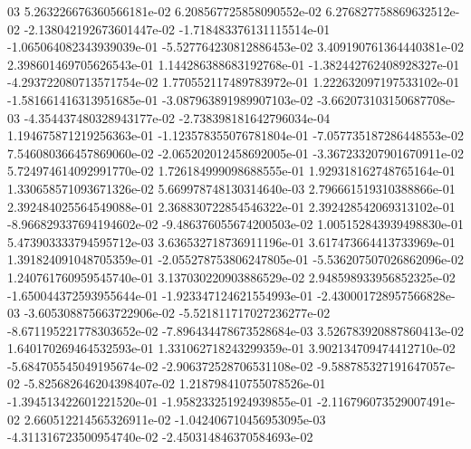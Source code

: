 03	5.263226676360566181e-02	6.208567725858090552e-02	6.276827758869632512e-02	-2.138042192673601447e-02	-1.718483376131115514e-01	-1.065064082343939039e-01	-5.527764230812886453e-02	3.409190761364440381e-02	2.398601469705626543e-01	1.144286388683192768e-01	-1.382442762408928327e-01	-4.293722080713571754e-02	1.770552117489783972e-01	1.222632097197533102e-01	-1.581661416313951685e-01	-3.087963891989907103e-02	-3.662073103150687708e-03	-4.354437480328943177e-02	-2.738398181642796034e-04	1.194675871219256363e-01	-1.123578355076781804e-01	-7.057735187286448553e-02	7.546080366457869060e-02	-2.065202012458692005e-01	-3.367233207901670911e-02	5.724974614092991770e-02	1.726184999098688555e-01	1.929318162748765164e-01	1.330658571093671326e-02	5.669978748130314640e-03	2.796661519310388866e-01	2.392484025564549088e-01	2.368830722854546322e-01	2.392428542069313102e-01	-8.966829337694194602e-02	-9.486376055674200503e-02	1.005152843939498830e-01	5.473903333794595712e-03	3.636532718736911196e-01	3.617473664413733969e-01	1.391824091048705359e-01	-2.055278753806247805e-01	-5.536207507026862096e-02	1.240761760959545740e-01	3.137030220903886529e-02	2.948598933956852325e-02	-1.650044372593955644e-01	-1.923347124621554993e-01	-2.430001728957566828e-03	-3.605308875663722906e-02	-5.521811717027236277e-02	-8.671195221778303652e-02	-7.896434478673528684e-03	3.526783920887860413e-02	1.640170269464532593e-01	1.331062718243299359e-01	3.902134709474412710e-02	-5.684705545049195674e-02	-2.906372528706531108e-02	-9.588785327191647057e-02	-5.825682646204398407e-02	1.218798410755078526e-01	-1.394513422601221520e-01	-1.958233251924939855e-01	-2.116796073529007491e-02	2.660512214565326911e-02	-1.042406710456953095e-03	-4.311316723500954740e-02	-2.450314846370584693e-02
